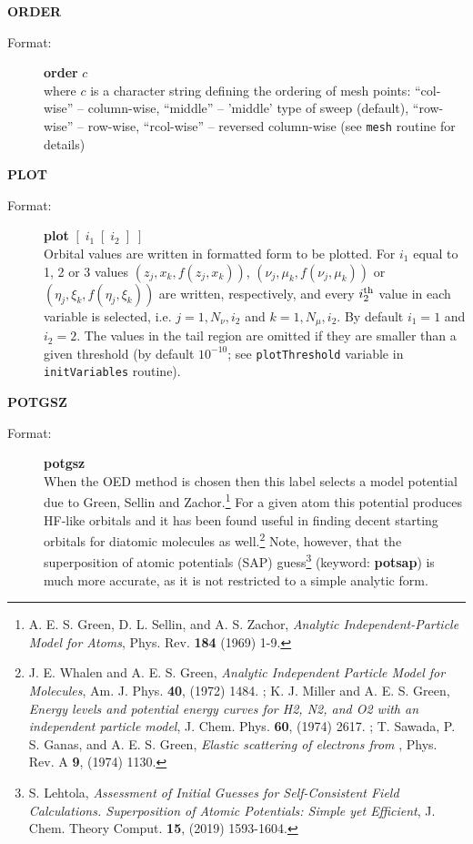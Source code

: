 \documentclass[10pt,a4paper]{article}
\newcommand{\ft}[1]{\texttt{#1}}
\begin{document}
\begin{description}
\item \textbf{ORDER}
\begin{description}
\item[Format:] \textbf{order} $c$\\
  where $c$ is a character string defining the ordering of mesh points:
  ``col-wise'' -- column-wise, ``middle'' -- 'middle' type of sweep
  (default), ``row-wise'' -- row-wise, ``rcol-wise'' -- reversed
  column-wise (see \ft{mesh} routine for details)
\end{description}

\item \textbf{PLOT}
\begin{description}
\item[Format:] \textbf{plot} $[\;i_1\;[\;i_2\;]\;]$\\
  Orbital values are written in formatted form to be plotted.  For $i_1$
  equal to 1, 2 or 3 values $(z_j,x_k,f(z_j,x_k))$,
  $(\nu_j,\mu_k,f(\nu_j,\mu_k))$ or $(\eta_j,\xi_k,f(\eta_j,\xi_k))$ are
  written, respectively, and every $i_2^{\rm th}$ value in each variable is
  selected, i.e. $j=1,N_{\nu},i_2$ and $k=1,N_{\mu},i_2$. By default $i_1=1$
  and $i_2=2$. The values in the tail region are omitted if they are
  smaller than a given threshold (by default $10^{-10}$; see
  \texttt{plotThreshold} variable in \texttt{initVariables} routine).

\end{description}


\item \textbf{POTGSZ}
\begin{description}
\item[Format:] \textbf{potgsz} \\ When the OED method is chosen then
  this label selects a model potential due to Green, Sellin and
  Zachor.\footnote{A. E. S. Green, D. L. Sellin, and A. S. Zachor,
    \textsl{Analytic Independent-Particle Model for Atoms},
    Phys. Rev. \textbf{184} (1969) 1-9. }
  For a given atom this potential produces HF-like orbitals and it has
  been found useful in finding decent starting orbitals for diatomic
  molecules as well.\footnote{J. E. Whalen and A. E. S. Green,
    \textsl{Analytic Independent Particle Model for Molecules},
    Am. J. Phys. \textbf{40}, (1972) 1484. ;
    K. J. Miller and A. E. S. Green, \textsl{Energy levels and
      potential energy curves for H2, N2, and O2 with an independent
      particle model}, J. Chem. Phys. \textbf{60}, (1974)
    2617. ; T. Sawada, P. S. Ganas, and
    A. E. S. Green, \textsl{Elastic scattering of electrons from
      }, Phys. Rev. A \textbf{9}, (1974)
    1130. } Note, however, that the
  superposition of atomic potentials (SAP) guess\footnote{S. Lehtola,
    \textsl{Assessment of Initial Guesses for Self-Consistent Field
      Calculations. Superposition of Atomic Potentials: Simple yet
      Efficient}, J. Chem. Theory Comput. \textbf{15}, (2019)
    1593-1604. } (keyword:
  \textbf{potsap}) is much more accurate, as it is not restricted to a
  simple analytic form.
\end{description}



\end{description}
\end{document}
